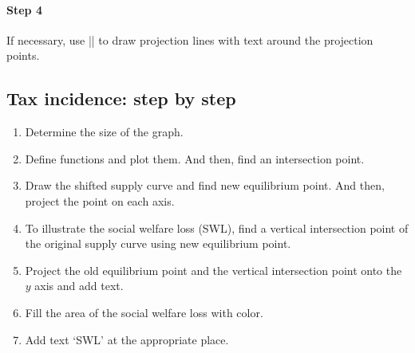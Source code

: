 \paragraph{Step 4} If necessary, use |\tzproj| to draw projection lines with text around the projection points.

\begin{tzcode}{.3}
\end{tzcode}

\subsection{Tax incidence: step by step}
\label{ssi:taxincidence}

\begin{enumerate}[{Step} 1{:}]
\item Determine the size of the graph.

\begin{tzcode}{.3}
\end{tzcode}

\item Define functions and plot them. And then, find an intersection point.
\item Draw the shifted supply curve and find new equilibrium point. And then, project the point on each axis.
\item To illustrate the social welfare loss (SWL), find a vertical intersection point of the original supply curve using new equilibrium point.
\item Project the old equilibrium point and the vertical intersection point onto the $y$ axis and add text.
\item Fill the area of the social welfare loss with color.
\item Add text `SWL' at the appropriate place. 
\end{enumerate}

